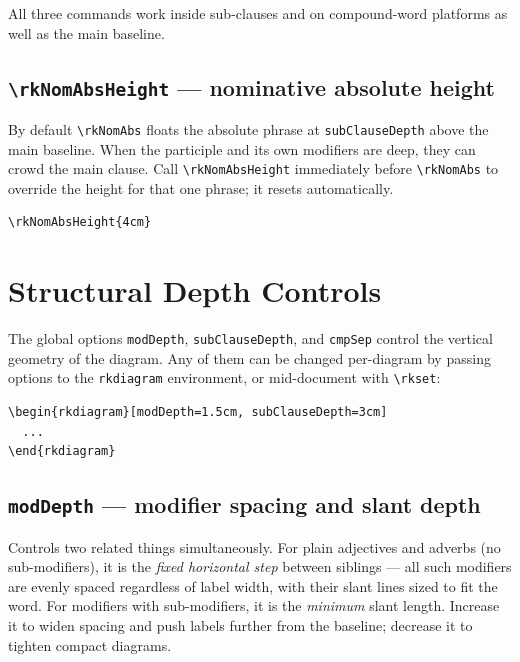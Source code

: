 \documentclass[11pt]{article}
\newcommand{\cmd}[1]{\texttt{\textbackslash #1}}
\newcommand{\opt}[1]{\texttt{#1}}
\begin{document}
All three commands work inside sub-clauses and on compound-word platforms as well as the main baseline.

\subsection*{\cmd{rkNomAbsHeight} — nominative absolute height}

By default \cmd{rkNomAbs} floats the absolute phrase at \texttt{subClauseDepth} above the main baseline.  When the participle and its own modifiers are deep, they can crowd the main clause.  Call \cmd{rkNomAbsHeight} immediately before \cmd{rkNomAbs} to override the height for that one phrase; it resets automatically.

\begin{lstlisting}
\rkNomAbsHeight{4cm}
\end{lstlisting}

\section{Structural Depth Controls}

The global options \opt{modDepth}, \opt{subClauseDepth}, and \opt{cmpSep} control the vertical geometry of the diagram. Any of them can be changed per-diagram by passing options to the \texttt{rkdiagram} environment, or mid-document with \cmd{rkset}:

\begin{lstlisting}
\begin{rkdiagram}[modDepth=1.5cm, subClauseDepth=3cm]
  ...
\end{rkdiagram}
\end{lstlisting}

\subsection*{\opt{modDepth} — modifier spacing and slant depth}

Controls two related things simultaneously. For plain adjectives and adverbs (no sub-modifiers), it is the \emph{fixed horizontal step} between siblings — all such modifiers are evenly spaced regardless of label width, with their slant lines sized to fit the word. For modifiers with sub-modifiers, it is the \emph{minimum} slant length. Increase it to widen spacing and push labels further from the baseline; decrease it to tighten compact diagrams.
\end{document}
